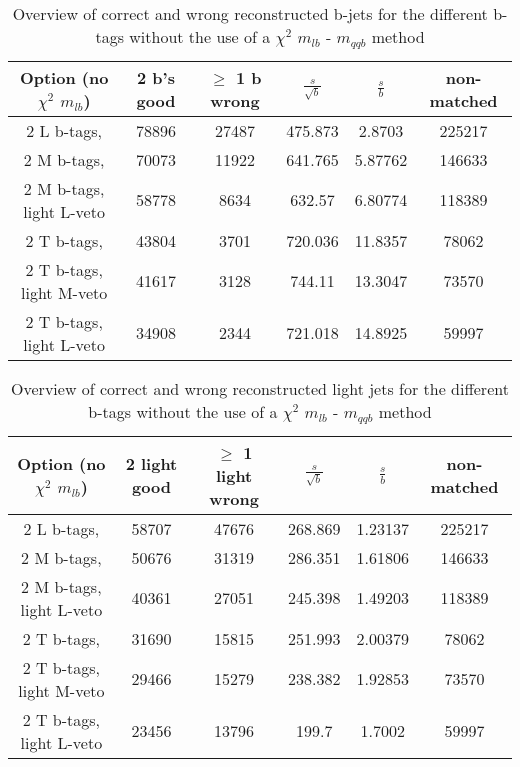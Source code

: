  \begin{table}[!h] 
 \begin{tabular}{c|c|c|c|c|c} 
 \textbf{Option} (no $\chi^{2}$ $m_{lb}$) & 2 b's good      & $\geq$ 1 b wrong     & $\frac{s}{\sqrt{b}}$ & $\frac{s}{b}$ & non-matched \\ \hline 
2 L b-tags,                & 78896 & 27487 & 475.873 & 2.8703 & 225217 \\ 
2 M b-tags,              & 70073 & 11922 & 641.765 & 5.87762 & 146633 \\ 
2 M b-tags, light L-veto & 58778 & 8634 & 632.57 & 6.80774 & 118389 \\ 
2 T b-tags,              & 43804 & 3701 & 720.036 & 11.8357 & 78062 \\ 
2 T b-tags, light M-veto & 41617 & 3128 & 744.11 & 13.3047 & 73570 \\ 
2 T b-tags, light L-veto & 34908 & 2344 & 721.018 & 14.8925 & 59997 \\ 
 \end{tabular} 
 \caption{Overview of correct and wrong reconstructed b-jets for the different b-tags without the use of a $\chi^{2}$ $m_{lb}$ - $m_{qqb}$ method} 
 \end{table} 
 
 \begin{table}[!h] 
 \begin{tabular}{c|c|c|c|c|c} 
 \textbf{Option} (no $\chi^{2}$ $m_{lb}$) & 2 light good    & $\geq$ 1 light wrong & $\frac{s}{\sqrt{b}}$ & $\frac{s}{b}$ & non-matched \\ \hline 
2 L b-tags,                & 58707 & 47676 & 268.869 & 1.23137 & 225217 \\ 
2 M b-tags,              & 50676 & 31319 & 286.351 & 1.61806 & 146633 \\ 
2 M b-tags, light L-veto & 40361 & 27051 & 245.398 & 1.49203 & 118389 \\ 
2 T b-tags,              & 31690 & 15815 & 251.993 & 2.00379 & 78062 \\ 
2 T b-tags, light M-veto & 29466 & 15279 & 238.382 & 1.92853 & 73570 \\ 
2 T b-tags, light L-veto & 23456 & 13796 & 199.7 & 1.7002 & 59997 \\ 
 \end{tabular} 
 \caption{Overview of correct and wrong reconstructed light jets for the different b-tags without the use of a $\chi^{2}$ $m_{lb}$ - $m_{qqb}$ method} 
 \end{table} 
 
